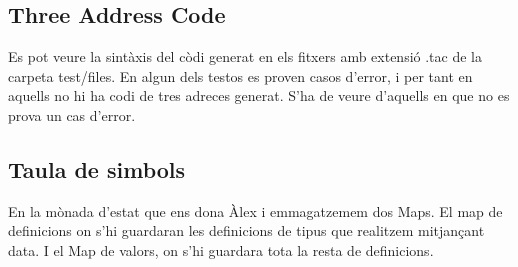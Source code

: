 \documentclass{article}
\begin{document}
\subsection{Three Address Code}
Es pot veure la sintàxis del còdi generat en els fitxers amb extensió
.tac de la carpeta test/files. En algun dels testos es proven casos d'error, i per tant en aquells no hi ha codi de tres adreces generat. S'ha de veure d'aquells en que no es prova un cas d'error.
\subsection{Taula de simbols}
En la mònada d'estat que ens dona Àlex i emmagatzemem dos Maps. El map
de definicions on s'hi guardaran les definicions de tipus que realitzem
mitjançant data. I el Map de valors, on s'hi guardara tota la resta de
definicions.
\end{document}

